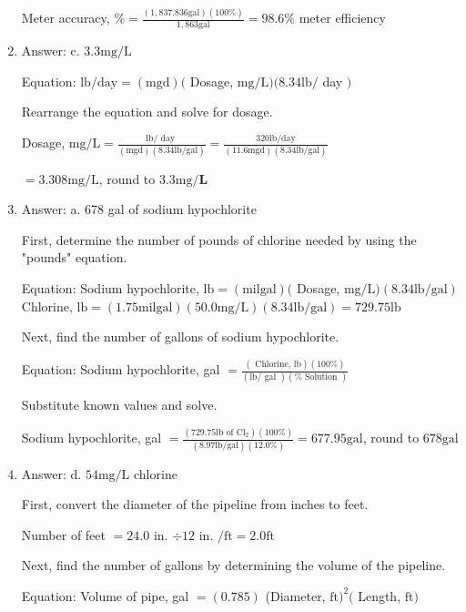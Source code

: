 \documentclass[10pt]{article}
\begin{document}
\begin{enumerate}
Meter accuracy, $\%=\frac{(1,837.836 \mathrm{gal})(100 \%)}{1,863 \mathrm{gal}}=98.6 \%$ meter efficiency

  \item Answer: c. $3.3 \mathrm{mg} / \mathrm{L}$

Equation: $\mathrm{lb} / \mathrm{day}=(\mathrm{mgd})($ Dosage, $\mathrm{mg} / \mathrm{L})(8.34 \mathrm{lb} /$ day $)$

Rearrange the equation and solve for dosage.

Dosage, $\mathrm{mg} / \mathrm{L}=\frac{\mathrm{lb} / \text { day }}{(\mathrm{mgd})(8.34 \mathrm{lb} / \mathrm{gal})}=\frac{320 \mathrm{lb} / \mathrm{day}}{(11.6 \mathrm{mgd})(8.34 \mathrm{lb} / \mathrm{gal})}$

$=3.308 \mathrm{mg} / \mathrm{L}$, round to $3.3 \mathrm{mg} / \mathbf{L}$

  \item Answer: a. 678 gal of sodium hypochlorite

First, determine the number of pounds of chlorine needed by using the "pounds" equation.

Equation: Sodium hypochlorite, $\mathrm{lb}=(\mathrm{mil} \mathrm{gal})($ Dosage, $\mathrm{mg} / \mathrm{L})(8.34 \mathrm{lb} / \mathrm{gal})$ Chlorine, $\mathrm{lb}=(1.75 \mathrm{mil} \mathrm{gal})(50.0 \mathrm{mg} / \mathrm{L})(8.34 \mathrm{lb} / \mathrm{gal})=729.75 \mathrm{lb}$

Next, find the number of gallons of sodium hypochlorite.

Equation: Sodium hypochlorite, gal $=\frac{(\text { Chlorine, } \mathrm{lb})(100 \%)}{(\mathrm{lb} / \text { gal })(\% \text { Solution })}$

Substitute known values and solve.

Sodium hypochlorite, gal $=\frac{\left(729.75 \mathrm{lb} \text { of } \mathrm{Cl}_{2}\right)(100 \%)}{(8.97 \mathrm{lb} / \mathrm{gal})(12.0 \%)}=677.95 \mathrm{gal}$, round to $678 \mathrm{gal}$

  \item Answer: d. $54 \mathrm{mg} / \mathrm{L}$ chlorine

First, convert the diameter of the pipeline from inches to feet.

Number of feet $=24.0$ in. $\div 12$ in. $/ \mathrm{ft}=2.0 \mathrm{ft}$

Next, find the number of gallons by determining the volume of the pipeline.

Equation: Volume of pipe, gal $=(0.785)$ (Diameter, $\mathrm{ft})^{2}($ Length, $\mathrm{ft})$


\end{enumerate}
\end{document}
